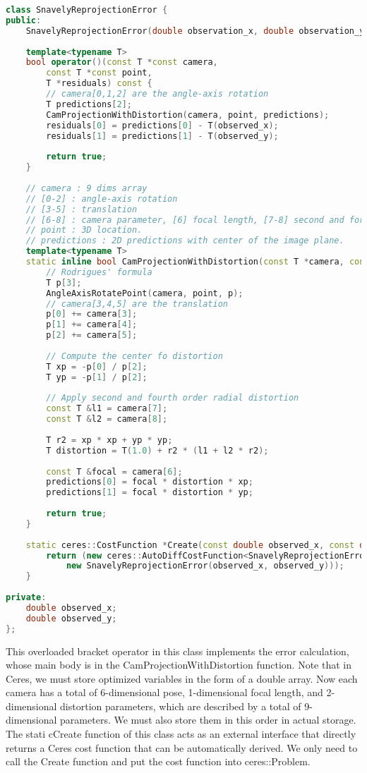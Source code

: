 \begin{lstlisting}[language=c++, caption=slambook2/ch9/SnavelyReprojectionError.cpp (part)]
class SnavelyReprojectionError {
public:
	SnavelyReprojectionError(double observation_x, double observation_y) : observed_x(observation_x), observed_y(observation_y) {}
	
	template<typename T>
	bool operator()(const T *const camera,
		const T *const point,
		T *residuals) const {
		// camera[0,1,2] are the angle-axis rotation
		T predictions[2];
		CamProjectionWithDistortion(camera, point, predictions);
		residuals[0] = predictions[0] - T(observed_x);
		residuals[1] = predictions[1] - T(observed_y);
		
		return true;
	}
	
	// camera : 9 dims array
	// [0-2] : angle-axis rotation
	// [3-5] : translation
	// [6-8] : camera parameter, [6] focal length, [7-8] second and forth order radial distortion
	// point : 3D location.
	// predictions : 2D predictions with center of the image plane.
	template<typename T>
	static inline bool CamProjectionWithDistortion(const T *camera, const T *point, T *predictions) {
		// Rodrigues' formula
		T p[3];
		AngleAxisRotatePoint(camera, point, p);
		// camera[3,4,5] are the translation
		p[0] += camera[3];
		p[1] += camera[4];
		p[2] += camera[5];
		
		// Compute the center fo distortion
		T xp = -p[0] / p[2];
		T yp = -p[1] / p[2];
		
		// Apply second and fourth order radial distortion
		const T &l1 = camera[7];
		const T &l2 = camera[8];
		
		T r2 = xp * xp + yp * yp;
		T distortion = T(1.0) + r2 * (l1 + l2 * r2);
		
		const T &focal = camera[6];
		predictions[0] = focal * distortion * xp;
		predictions[1] = focal * distortion * yp;
		
		return true;
	}
	
	static ceres::CostFunction *Create(const double observed_x, const double observed_y) {
		return (new ceres::AutoDiffCostFunction<SnavelyReprojectionError, 2, 9, 3>(
			new SnavelyReprojectionError(observed_x, observed_y)));
	}
	
private:
	double observed_x;
	double observed_y;
};
\end{lstlisting}
This overloaded bracket operator in this class implements the error calculation, whose main body is in the  CamProjectionWithDistortion function. Note that in Ceres, we must store optimized variables in the form of a double array. Now each camera has a total of 6-dimensional pose, 1-dimensional focal length, and 2-dimensional distortion parameters, which are described by a total of 9-dimensional parameters. We must also store them in this order in actual storage. The stati cCreate function of this class acts as an external interface that directly returns a Ceres cost function that can be automatically derived. We only need to call the Create function and put the cost function into ceres::Problem.

